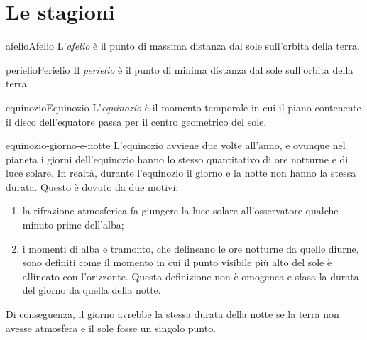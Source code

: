 \documentclass[preview]{standalone}
\begin{document}
\genpage

\section{Le stagioni}


\begin{snippetdefinition}{afelio}{Afelio}
    L'\textit{afelio} è il punto di massima distanza dal sole sull'orbita
    della terra.
\end{snippetdefinition}

\begin{snippetdefinition}{perielio}{Perielio}
    Il \textit{perielio} è il punto di minima distanza dal sole sull'orbita
    della terra.
\end{snippetdefinition}


\begin{snippetdefinition}{equinozio}{Equinozio}
    L'\textit{equinozio} è il momento temporale in
    cui il piano contenente il disco dell'equatore
    passa per il centro geometrico del sole.
\end{snippetdefinition}

\begin{snippet}{equinozio-giorno-e-notte}
    L'equinozio avviene due volte all'anno, e ovunque nel pianeta i giorni dell'equinozio hanno lo stesso quantitativo di ore notturne e di luce solare.
    In realtà, durante l'equinozio il giorno e la notte non hanno la stessa durata.
    Questo è dovuto da due motivi:
    \begin{enumerate}
        \item la rifrazione atmosferica fa giungere la luce solare all'osservatore qualche minuto prime dell'alba;
        \item i momenti di alba e tramonto, che delineano le ore notturne da quelle diurne, sono definiti come il momento in cui il punto visibile più alto del sole è allineato con l'orizzonte. Questa definizione non è omogenea e sfasa la durata del giorno da quella della notte.
    \end{enumerate}
    Di conseguenza, il giorno avrebbe la stessa durata della notte se la terra non avesse atmosfera e il sole fosse un singolo punto.
\end{snippet}
\end{document}
